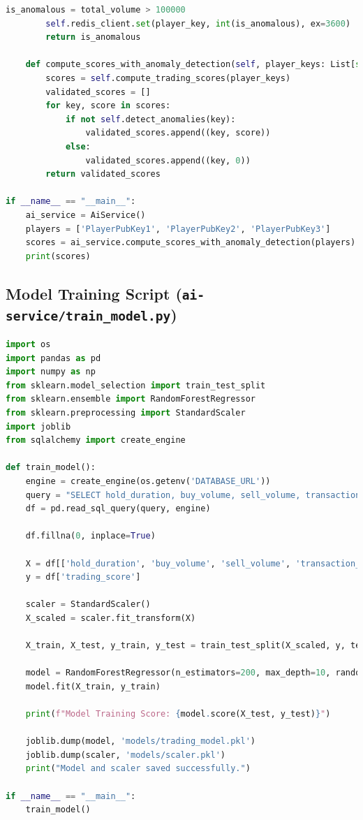 \documentclass[11pt,a4paper]{article}
\begin{document}
\begin{lstlisting}[language=Python, caption={AI Service Layer}]
        is_anomalous = total_volume > 100000
        self.redis_client.set(player_key, int(is_anomalous), ex=3600)
        return is_anomalous

    def compute_scores_with_anomaly_detection(self, player_keys: List[str]) -> List[Tuple[str, int]]:
        scores = self.compute_trading_scores(player_keys)
        validated_scores = []
        for key, score in scores:
            if not self.detect_anomalies(key):
                validated_scores.append((key, score))
            else:
                validated_scores.append((key, 0))
        return validated_scores

if __name__ == "__main__":
    ai_service = AiService()
    players = ['PlayerPubKey1', 'PlayerPubKey2', 'PlayerPubKey3']
    scores = ai_service.compute_scores_with_anomaly_detection(players)
    print(scores)
\end{lstlisting}

\subsection{Model Training Script (\texttt{ai-service/train_model.py})}

\begin{lstlisting}[language=Python, caption={Model Training Script}]
import os
import pandas as pd
import numpy as np
from sklearn.model_selection import train_test_split
from sklearn.ensemble import RandomForestRegressor
from sklearn.preprocessing import StandardScaler
import joblib
from sqlalchemy import create_engine

def train_model():
    engine = create_engine(os.getenv('DATABASE_URL'))
    query = "SELECT hold_duration, buy_volume, sell_volume, transaction_frequency, trading_score FROM trading_data"
    df = pd.read_sql_query(query, engine)

    df.fillna(0, inplace=True)

    X = df[['hold_duration', 'buy_volume', 'sell_volume', 'transaction_frequency']]
    y = df['trading_score']

    scaler = StandardScaler()
    X_scaled = scaler.fit_transform(X)

    X_train, X_test, y_train, y_test = train_test_split(X_scaled, y, test_size=0.2, random_state=42)

    model = RandomForestRegressor(n_estimators=200, max_depth=10, random_state=42)
    model.fit(X_train, y_train)

    print(f"Model Training Score: {model.score(X_test, y_test)}")

    joblib.dump(model, 'models/trading_model.pkl')
    joblib.dump(scaler, 'models/scaler.pkl')
    print("Model and scaler saved successfully.")

if __name__ == "__main__":
    train_model()
\end{lstlisting}
\end{document}
